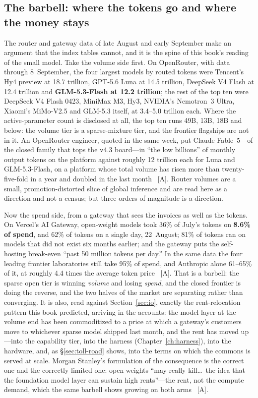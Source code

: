\subsection{The barbell: where the tokens go and where the money stays}
\label{sec:barbell}

The router and gateway data of late August and early September make an argument that the index tables cannot, and it is the spine of this book's reading of the small model. Take the volume side first. On OpenRouter, with data through 8~September, the four largest models by routed tokens were Tencent's Hy4 preview at 18.7 trillion, GPT-5.6 Luna at 14.5 trillion, DeepSeek V4 Flash at 12.4 trillion and \textbf{GLM-5.3-Flash at 12.2 trillion}; the rest of the top ten were DeepSeek V4 Flash 0423, MiniMax M3, Hy3, NVIDIA's Nemotron~3 Ultra, Xiaomi's MiMo-V2.5 and GLM-5.3 itself, at 3.4--5.0 trillion each. Where the active-parameter count is disclosed at all, the top ten runs 49B, 13B, 18B and below: the volume tier is a sparse-mixture tier, and the frontier flagships are not in it. An OpenRouter engineer, quoted in the same week, put Claude Fable~5---of the closed family that tops the v4.3 board---in ``the low billions'' of monthly output tokens on the platform against roughly 12 trillion each for Luna and GLM-5.3-Flash, on a platform whose total volume has risen more than twenty-five-fold in a year and doubled in the last month~\cite{openrouter-sep26} [A]. Router volumes are a small, promotion-distorted slice of global inference and are read here as a direction and not a census; but three orders of magnitude is a direction.

Now the spend side, from a gateway that sees the invoices as well as the tokens. On Vercel's AI Gateway, open-weight models took 36\% of July's tokens on \textbf{8.6\% of spend}, and 62\% of tokens on a single day, 22~August; 81\% of tokens ran on models that did not exist six months earlier; and the gateway puts the self-hosting break-even ``past 50 million tokens per day.'' In the same data the four leading frontier laboratories still take 95\% of spend, and Anthropic alone 61--65\% of it, at roughly 4.4 times the average token price~\cite{vercel-aug26} [A]. That is a barbell: the sparse open tier is winning \emph{volume} and losing \emph{spend}, and the closed frontier is doing the reverse, and the two halves of the market are separating rather than converging. It is also, read against Section~\ref{sec:io}, exactly the rent-relocation pattern this book predicted, arriving in the accounts: the model layer at the volume end has been commoditized to a price at which a gateway's customers move to whichever sparse model shipped last month, and the rent has moved up---into the capability tier, into the harness (Chapter~\ref{ch:harness}), into the hardware, and, as \S\ref{sec:toll-road} shows, into the terms on which the commons is served at scale. Morgan Stanley's formulation of the consequence is the correct one and the correctly limited one: open weights ``may really kill\ldots\ the idea that the foundation model layer can sustain high rents''---the rent, not the compute demand, which the same barbell shows growing on both arms~\cite{slm-belcak} [A].

